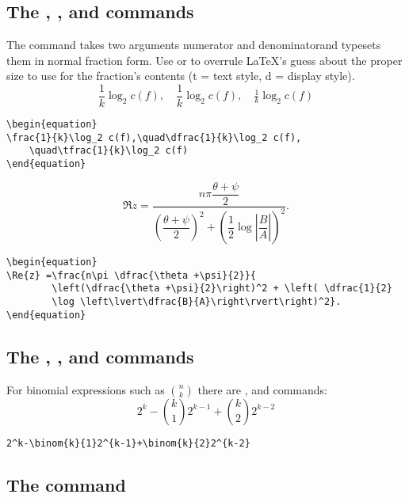 \subsection{The , , and
   commands}

The  command takes two arguments\mdash
numerator and denominator\mdash and typesets them in normal fraction
form. Use  or  to overrule \LaTeX{}'s guess about
the proper size to use for the fraction's contents (t = text style, d =
display style).
\begin{equation}
\frac{1}{k}\log_2 c(f),\quad\dfrac{1}{k}\log_2 c(f),\quad\tfrac{1}{k}\log_2 c(f)
\end{equation}
\begin{verbatim}
\begin{equation}
\frac{1}{k}\log_2 c(f),\quad\dfrac{1}{k}\log_2 c(f),
    \quad\tfrac{1}{k}\log_2 c(f)
\end{equation}
\end{verbatim}
\begin{equation}
\Re{z} =\frac{n\pi \dfrac{\theta +\psi}{2}}{
        \left(\dfrac{\theta +\psi}{2}\right)^2 + \left( \dfrac{1}{2}
        \log \left\lvert\dfrac{B}{A}\right\rvert\right)^2}.
\end{equation}
\begin{verbatim}
\begin{equation}
\Re{z} =\frac{n\pi \dfrac{\theta +\psi}{2}}{
        \left(\dfrac{\theta +\psi}{2}\right)^2 + \left( \dfrac{1}{2}
        \log \left\lvert\dfrac{B}{A}\right\rvert\right)^2}.
\end{equation}
\end{verbatim}

\subsection{The , , and
         commands}

For binomial expressions such as $\binom{n}{k}$
there are ,  and  commands:
\begin{equation}
2^k-\binom{k}{1}2^{k-1}+\binom{k}{2}2^{k-2}
\end{equation}
\begin{verbatim}
2^k-\binom{k}{1}2^{k-1}+\binom{k}{2}2^{k-2}
\end{verbatim}

\subsection{The  command}

